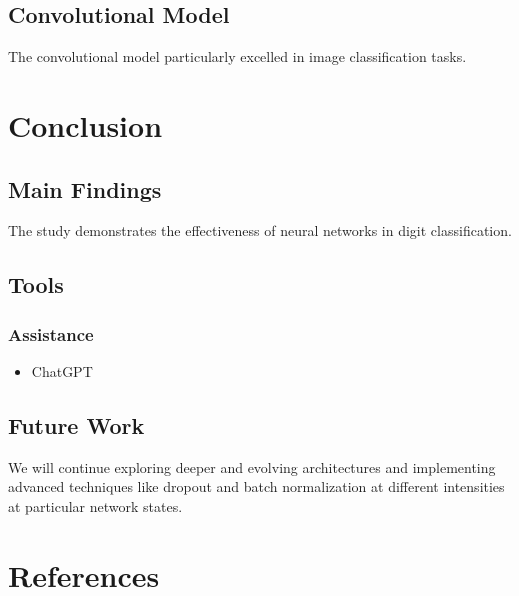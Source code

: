 \documentclass[utf8,1pt]{extarticle} %
\begin{document}
\subsection{Convolutional Model}
The convolutional model particularly excelled in 
image classification tasks.
\section{Conclusion}
\subsection{Main Findings}
The study demonstrates the effectiveness of 
neural networks in digit classification. 
\subsection{Tools}
\subsubsection{Assistance}
\begin{itemize}
    \item ChatGPT
\end{itemize}
\subsection{Future Work}
We will continue exploring 
deeper and evolving architectures and 
implementing advanced techniques like 
dropout and batch normalization at different intensities
at particular network states.


\section{References}

\end{document}
